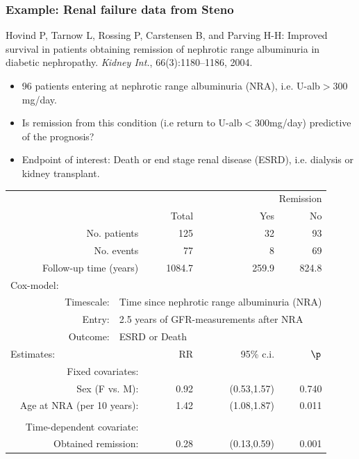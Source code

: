 \begin{frame}
   \frametitle{Example: Renal failure data from Steno}
{\small
Hovind P, Tarnow L, Rossing P, Carstensen B, and Parving H-H:
 Improved survival in patients obtaining remission of nephrotic range
  albuminuria in diabetic nephropathy.
{\em Kidney Int.}, 66(3):1180--1186, 2004.}
\begin{itemize}[<+->]
\item 96 patients entering at nephrotic range albuminuria (NRA),
  i.e. U-alb$>300$mg/day.

\item Is remission from this condition (i.e return to
  U-alb$<300$mg/day) predictive of the prognosis?

\item Endpoint of interest: Death or end stage renal disease (ESRD),
  i.e. dialysis or kidney transplant.
\end{itemize}
\end{frame}

\begin{frame}

\small
\renewcommand{\arraystretch}{0.8}
\begin{tabular}{rlrrr}
\toprule
& & & \multicolumn{2}{r}{Remission} \\
\cmidrule{4-5}
& & Total & Yes & No \\
   \midrule
\multicolumn{2}{r}{No. patients          } &  125   &  32   &  93   \\
\multicolumn{2}{r}{No. events            } &   77   &   8   &  69   \\
\multicolumn{2}{r}{Follow-up time (years)} & 1084.7 & 259.9 & 824.8 \\
 \midrule
 \multicolumn{2}{l}{Cox-model:} \\
Timescale: & \multicolumn{4}{l}{Time since nephrotic range albuminuria
                       (NRA)} \\
    Entry: & \multicolumn{4}{l}{2.5 years of GFR-measurements after NRA} \\
  Outcome: & \multicolumn{4}{l}{ESRD or Death} \\
\multicolumn{2}{l}{Estimates:}
  & RR & 95\% c.i. & $\p$ \\
 \midrule
\multicolumn{2}{r}{Fixed covariates:} \\
\multicolumn{2}{r}{Sex (F vs. M):}             & 0.92 & (0.53,1.57) & 0.740 \\
\multicolumn{2}{r}{Age at NRA (per 10 years):} & 1.42 & (1.08,1.87) & 0.011 \\
 \\
\multicolumn{2}{r}{Time-dependent covariate:} \\
\multicolumn{2}{r}{Obtained remission:      }  & 0.28 & (0.13,0.59) & 0.001 \\
 \bottomrule
\end{tabular}
\renewcommand{\arraystretch}{1.0}
\normalsize
\end{frame}

